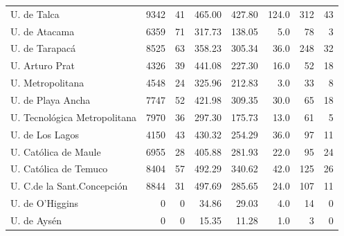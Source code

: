 \documentclass[twocolumn]{article}
\begin{document}
\begin{table}[t]
\begin{tabular}{l rrrrrrr}
U. de Talca	               &  9342 	& 41 &    465.00& 427.80&124.0  &   312&	 43  \\
U. de Atacama              &  6359 	& 71 &    317.73& 138.05&  5.0  &    78&	  3  \\
U. de Tarapacá             &  8525 	& 63 &    358.23& 305.34& 36.0  &   248&	 32  \\
U. Arturo Prat             &  4326 	& 39 &    441.08& 227.30& 16.0  &    52&	 18  \\
U. Metropolitana           &  4548 	& 24 &    325.96& 212.83&  3.0  &    33&	  8  \\
U. de Playa Ancha          &  7747 	& 52 &    421.98& 309.35& 30.0  &    65&	 18  \\
U. Tecnológica Metropolitana& 7970 	& 36 &    297.30& 175.73& 13.0  &    61&	  5  \\
U. de Los Lagos            &  4150 	& 43 &    430.32& 254.29& 36.0  &    97&	 11  \\
U. Católica de Maule       &  6955 	& 28 &    405.88& 281.93& 22.0  &    95&	 24  \\
U. Católica de Temuco      &  8404 	& 57 &    492.29& 340.62& 42.0  &   125&	 26  \\
U. C.de la Sant.Concepción &  8844 	& 31 &    497.69& 285.65& 24.0  &   107&	 11  \\
U. de O'Higgins	           &     0 	&  0 &	   34.86& 29.03 &  4.0  &    14&	  0  \\
U. de Aysén                &	 0  &  0 & 	   15.35& 11.28 &  1.0  &    3 &      0  \\
\hline
\end{tabular}
\end{table}
\end{document}
